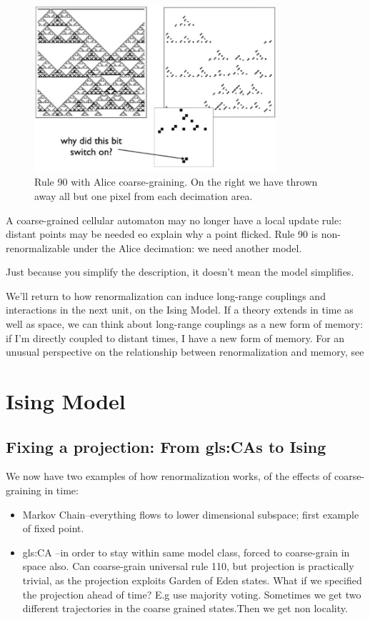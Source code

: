 \documentclass[]{article}
\begin{document}
\begin{figure}[H]
	\begin{center}
		\caption[Rule 90 with Alice coarse-graining]{Rule 90 with Alice coarse-graining. On the right we have thrown away all but one pixel from each decimation area.}\label{fig:rule90-alice}
		\includegraphics[width=0.8\textwidth]{rule90-alice}
	\end{center}
\end{figure}

A coarse-grained cellular automaton may no longer have a local update rule: distant points may be needed eo explain why a point flicked. Rule 90 is non-renormalizable under the Alice decimation: we need another model.

Just because you simplify the description, it doesn't mean the model simplifies.

We'll return to how renormalization can induce long-range couplings and interactions in the next unit, on the Ising Model. If a theory extends in time as well as space, we can think about long-range couplings as a new form of memory: if I'm directly coupled to distant times, I have a new form of memory. For an unusual perspective on the relationship between renormalization and memory, see \cite{dedeo2018origin}

\section{Ising Model}

\subsection{Fixing a projection: From \glsdescplural{gls:CA} to Ising}
We now have two examples of how renormalization works, of the effects of coarse-graining in time:
\begin{itemize}
	\item Markov Chain--everything flows to lower dimensional subspace; first example of fixed point.
	\item \gls{gls:CA} --in order to stay within same model class, forced to coarse-grain in space also. Can coarse-grain universal rule 110, but projection is practically trivial, as the projection exploits Garden of Eden states. What if we specified the projection ahead of time? E.g use majority voting. Sometimes we get two different trajectories in the coarse grained states.Then we get non locality. 
\end{itemize}
\end{document}
